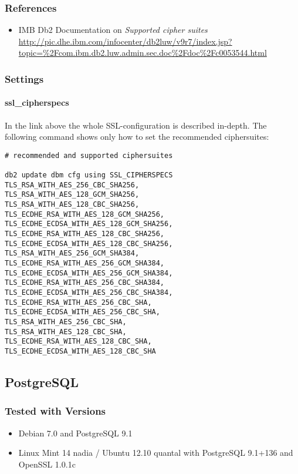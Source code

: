 \subsubsection{References}
\begin{itemize}
  \item IMB Db2 Documentation on \emph{Supported cipher suites} \url{http://pic.dhe.ibm.com/infocenter/db2luw/v9r7/index.jsp?topic=\%2Fcom.ibm.db2.luw.admin.sec.doc\%2Fdoc\%2Fc0053544.html}
\end{itemize}


\subsubsection{Settings}
\paragraph*{ssl\_cipherspecs}
In the link above the whole SSL-configuration is described in-depth. The following command shows only how to set the recommended ciphersuites:
\begin{lstlisting}
# recommended and supported ciphersuites 

db2 update dbm cfg using SSL_CIPHERSPECS 
TLS_RSA_WITH_AES_256_CBC_SHA256,
TLS_RSA_WITH_AES_128_GCM_SHA256,
TLS_RSA_WITH_AES_128_CBC_SHA256,
TLS_ECDHE_RSA_WITH_AES_128_GCM_SHA256,
TLS_ECDHE_ECDSA_WITH_AES_128_GCM_SHA256,
TLS_ECDHE_RSA_WITH_AES_128_CBC_SHA256,
TLS_ECDHE_ECDSA_WITH_AES_128_CBC_SHA256,
TLS_RSA_WITH_AES_256_GCM_SHA384,
TLS_ECDHE_RSA_WITH_AES_256_GCM_SHA384,
TLS_ECDHE_ECDSA_WITH_AES_256_GCM_SHA384,
TLS_ECDHE_RSA_WITH_AES_256_CBC_SHA384,
TLS_ECDHE_ECDSA_WITH_AES_256_CBC_SHA384,
TLS_ECDHE_RSA_WITH_AES_256_CBC_SHA,
TLS_ECDHE_ECDSA_WITH_AES_256_CBC_SHA,
TLS_RSA_WITH_AES_256_CBC_SHA,
TLS_RSA_WITH_AES_128_CBC_SHA,
TLS_ECDHE_RSA_WITH_AES_128_CBC_SHA,
TLS_ECDHE_ECDSA_WITH_AES_128_CBC_SHA
\end{lstlisting}


\subsection{PostgreSQL}
\subsubsection{Tested with Versions}
\begin{itemize}
  \item Debian 7.0 and PostgreSQL 9.1
  \item Linux Mint 14 nadia / Ubuntu 12.10 quantal with PostgreSQL 9.1+136 and OpenSSL 1.0.1c
\end{itemize}


